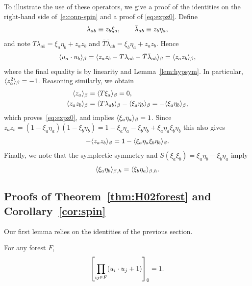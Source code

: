 \documentclass[11pt]{amsart}
\numberwithin{equation}{section}
\numberwithin{theorem}{section}
\begin{document}
To illustrate the use of these operators, we give a proof of 
the identities on the right-hand side of~\eqref{e:conn-spin} and a proof of \eqref{eq:expz0}.
Define
\begin{equation}
  \label{eq:lambda}
  \lambda_{ab} \equiv z_b\xi_a, \qquad
  \bar\lambda_{ab} \equiv z_b\eta_a,  
\end{equation}
and note $T\lambda_{ab} = \xi_a\eta_b + z_az_b $ and
$\bar T \bar\lambda_{ab}= \xi_{b}\eta_{a}+z_{a}z_{b}$. Hence
\begin{equation}
  \label{e:conn-alg}
  \langle u_a\cdot u_b \rangle_\beta = \langle z_az_b - T \lambda_{ab}-\bar T
    \bar\lambda_{ab} \rangle_\beta = \langle z_az_b \rangle_\beta, 
\end{equation}
where the final equality is by linearity and
Lemma~\ref{lem:hypsym}. In particular,
 $\langle z_{a}^{2} \rangle_{\beta}=-1$.
Reasoning similarly, we obtain
\begin{align} \label{e:z0}
  \langle z_a \rangle_\beta &= \langle T\xi_a \rangle_\beta =0, \\
  \label{e:zazb1}
  \langle z_a z_b \rangle_{\beta}
  &=  \langle T\lambda_{ab} \rangle_\beta -\langle \xi_a \eta_b \rangle_{\beta}
  = -\langle \xi_a \eta_b \rangle_{\beta},
\end{align}
which proves~\eqref{eq:expz0}, and implies
$\langle \xi_{a}\eta_{a} \rangle_{\beta}=1$. Since
$z_az_b = (1-\xi_a\eta_a)(1-\xi_b\eta_b) = 1 - \xi_a\eta_a -
\xi_b\eta_b + \xi_a\eta_a \xi_b\eta_b$ this also gives
\begin{equation} \label{e:zazb2}
  -\langle z_a z_b \rangle_\beta = 1-\langle \xi_a\eta_a \xi_b\eta_b \rangle_\beta.
\end{equation}
Finally, we note that the symplectic symmetry and  $S(\xi_a\xi_b) = \xi_a\eta_b - \xi_b\eta_a$ imply
\begin{equation} \label{e:xieta-symmetry}
  \langle \xi_a\eta_b \rangle_{\beta,h} = \langle \xi_b\eta_a \rangle_{\beta,h}.
\end{equation}

\subsection{Proofs of Theorem~\ref{thm:H02forest}  and Corollary~\ref{cor:spin}}
\label{S:H02-USF}

Our first lemma relies on the identities of the previous section.
\begin{lemma} \label{lem:tree}
  For any forest $F$,
  \begin{equation} \label{e:tree}
    \left[{ \prod_{ij \in F} (u_i\cdot u_j+1)}\right]_0 = 1.
  \end{equation}
\end{lemma}
\end{document}
